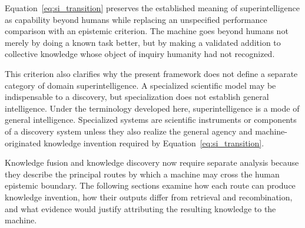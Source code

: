 Equation~\eqref{eq:si_transition} preserves the established meaning of
superintelligence as capability beyond humans \cite{bostrom2014superintelligence}
while replacing an unspecified performance comparison with an epistemic
criterion. The machine goes beyond humans not merely by doing a known task
better, but by making a validated addition to collective knowledge whose object
of inquiry humanity had not recognized.

This criterion also clarifies why the present framework does not define a
separate category of domain superintelligence. A specialized scientific model
may be indispensable to a discovery, but specialization does not establish
general intelligence. Under the terminology developed here,
superintelligence is a mode of general intelligence. Specialized systems are
scientific instruments or components of a discovery system unless they also
realize the general agency and machine-originated knowledge invention required
by Equation~\eqref{eq:si_transition}.

Knowledge fusion and knowledge discovery now require separate analysis because
they describe the principal routes by which a machine may cross the human
epistemic boundary. The following sections examine how each route can produce
knowledge invention, how their outputs differ from retrieval and recombination,
and what evidence would justify attributing the resulting knowledge to the
machine.
